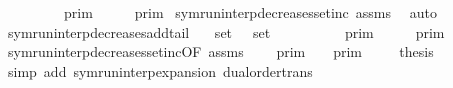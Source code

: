 \begin{isabellebody}
\ \ \ \ \ {\isacartoucheopen}{\isasymlbrakk}{\isasymlbrakk}\ {\isasymgamma}\ {\isacharhash}\ {\isasymGamma}\ {\isasymrbrakk}{\isasymrbrakk}\isactrlsub p\isactrlsub r\isactrlsub i\isactrlsub m\ {\isasymsupseteq}\ {\isasymlbrakk}{\isasymlbrakk}\ {\isasymgamma}\ {\isacharhash}\ {\isasymGamma}{\isacharprime}\ {\isasymrbrakk}{\isasymrbrakk}\isactrlsub p\isactrlsub r\isactrlsub i\isactrlsub m{\isacartoucheclose}\isanewline
%
\isadelimproof
%
\endisadelimproof
%
\isatagproof
{}\isamarkupfalse%
\ symrun{\isacharunderscore}interp{\isacharunderscore}decreases{\isacharunderscore}setinc\ assms\ \isamarkupfalse%
\ auto%
\endisatagproof
{\isafoldproof}%
%
\isadelimproof
\isanewline
%
\endisadelimproof
\isanewline
{}\isamarkupfalse%
\ symrun{\isacharunderscore}interp{\isacharunderscore}decreases{\isacharunderscore}add{\isacharunderscore}tail{\isacharcolon}\isanewline
\ \ \ {\isacartoucheopen}set\ {\isasymGamma}\ {\isasymsubseteq}\ set\ {\isasymGamma}{\isacharprime}{\isacartoucheclose}\isanewline
\ \ \ \ \ {\isacartoucheopen}{\isasymlbrakk}{\isasymlbrakk}\ {\isasymGamma}\ {\isacharat}\ {\isacharbrackleft}{\isasymgamma}{\isacharbrackright}\ {\isasymrbrakk}{\isasymrbrakk}\isactrlsub p\isactrlsub r\isactrlsub i\isactrlsub m\ {\isasymsupseteq}\ {\isasymlbrakk}{\isasymlbrakk}\ {\isasymGamma}{\isacharprime}\ {\isacharat}\ {\isacharbrackleft}{\isasymgamma}{\isacharbrackright}\ {\isasymrbrakk}{\isasymrbrakk}\isactrlsub p\isactrlsub r\isactrlsub i\isactrlsub m{\isacartoucheclose}\isanewline
%
\isadelimproof
%
\endisadelimproof
%
\isatagproof
{}\isamarkupfalse%
\ {\isacharminus}\isanewline
\ \ \isamarkupfalse%
\ symrun{\isacharunderscore}interp{\isacharunderscore}decreases{\isacharunderscore}setinc{\isacharbrackleft}OF\ assms{\isacharbrackright}\ \isamarkupfalse%
\ {\isacartoucheopen}{\isasymlbrakk}{\isasymlbrakk}\ {\isasymGamma}{\isacharprime}\ {\isasymrbrakk}{\isasymrbrakk}\isactrlsub p\isactrlsub r\isactrlsub i\isactrlsub m\ {\isasymsubseteq}\ {\isasymlbrakk}{\isasymlbrakk}\ {\isasymGamma}\ {\isasymrbrakk}{\isasymrbrakk}\isactrlsub p\isactrlsub r\isactrlsub i\isactrlsub m{\isacartoucheclose}\ \isacommand{{\isachardot}}\isamarkupfalse%
\isanewline
\ \ \isamarkupfalse%
\ {\isacharquery}thesis\ \isamarkupfalse%
\ {\isacharparenleft}simp\ add{\isacharcolon}\ symrun{\isacharunderscore}interp{\isacharunderscore}expansion\ dual{\isacharunderscore}order{\isachardot}trans{\isacharparenright}\isanewline
{}\isamarkupfalse%

\end{isabellebody}
